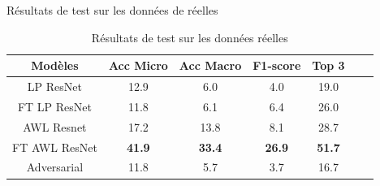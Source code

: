 \documentclass[11pt]{beamer}
\begin{document}
\begin{frame}{Résultats de test sur les données de réelles}
    \begin{table}[ht]
      \centering
        \begin{tabular}{ccccccc}
        \toprule
        Modèles & Acc Micro & Acc Macro & F1-score & Top 3 \\
        \midrule
        LP ResNet & 12.9 & 6.0 & 4.0 & 19.0 \\
        FT LP ResNet & 11.8 & 6.1 & 6.4 & 26.0 \\
        AWL Resnet & 17.2 & 13.8 & 8.1 & 28.7 \\
        FT AWL ResNet & \textbf{41.9} & \textbf{33.4} & \textbf{26.9} & \textbf{51.7} \\
        Adversarial & 11.8 & 5.7 & 3.7 & 16.7 \\
        \bottomrule
        \end{tabular}
        \caption{Résultats de test sur les données réelles}
        \label{tab: results_real}
    \end{table}
\end{frame}
\end{document}
